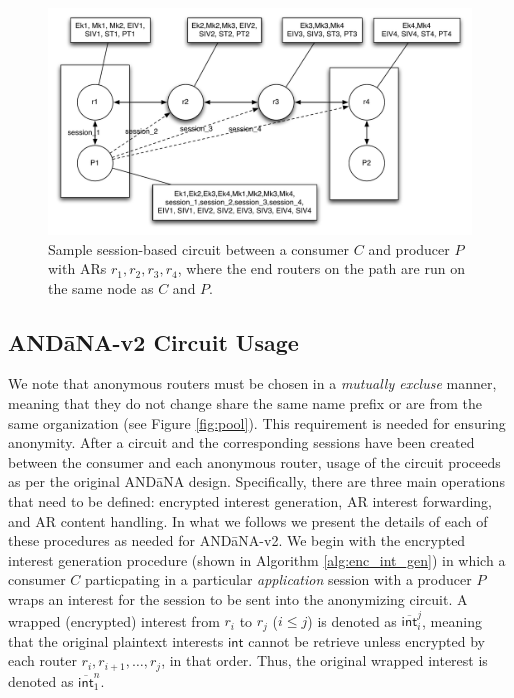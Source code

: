 \documentclass[10pt]{article}
\begin{document}
\begin{figure}[ht!]
\begin{center}
\includegraphics[scale=0.5]{./images/circuit.pdf}
\end{center}
\caption{Sample session-based circuit between a consumer $C$ and producer $P$ with ARs $r_1,r_2,r_3,r_4$, where the end routers on the path are run on the same node as $C$ and $P$.}
\label{fig:circuit}
\end{figure}

\subsection{{\sf AND\=aNA-v2} Circuit Usage}

We note that anonymous routers must be chosen in a \emph{mutually excluse} manner, meaning that they do not change share the same name prefix or are from the same organization (see Figure \ref{fig:pool}). This requirement is needed for ensuring anonymity. After a circuit and the corresponding sessions have been created between the consumer and each anonymous router, usage of the circuit proceeds as per the original {\sf AND\=aNA} design. Specifically, there are three main operations that need to be defined: encrypted interest generation, AR interest forwarding, and AR content handling. In what we follows we present the details of each of these procedures as needed for {\sf AND\=aNA-v2}. We begin with the encrypted interest generation procedure (shown in Algorithm \ref{alg:enc_int_gen}) in which a consumer $C$ particpating in a particular \emph{application} session with a producer $P$ wraps an interest for the session to be sent into the anonymizing circuit. A wrapped (encrypted) interest from $r_i$ to $r_j$ ($i \leq j$) is denoted as $\overline{\mathsf{int}}_i^j$, meaning that the original plaintext interests $\mathsf{int}$ cannot be retrieve unless encrypted by each router $r_i,r_{i+1},\dots,r_j$, in that order. Thus, the original wrapped interest is denoted as $\overline{\mathsf{int}}_1^n$.
\end{document}
